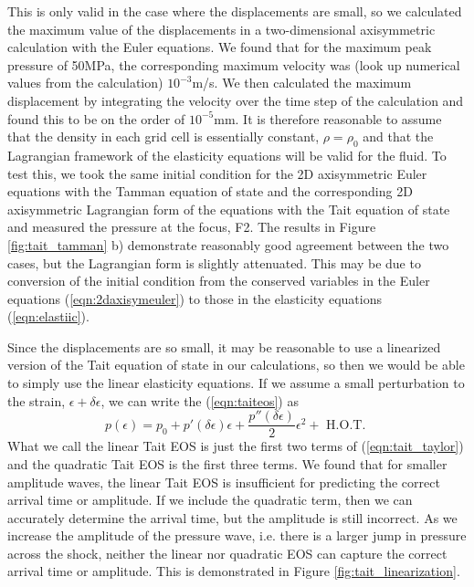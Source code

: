 \documentclass{article}
\begin{document}
This is only valid in the case where the displacements are small, so we calculated the maximum value of 
the displacements in a two-dimensional axisymmetric calculation with the Euler equations.  We found 
that for the maximum peak pressure of 50MPa, the corresponding maximum velocity was (look up 
numerical values from the calculation) $10^{-3}$m/s.  We then calculated the maximum displacement by 
integrating the velocity over the time step of the calculation and found this to be on the order of 
$10^{-5}$mm.  It is therefore reasonable to assume that the density in each grid cell is essentially 
constant, $\rho = \rho_0$ and that the Lagrangian framework of the elasticity equations will be valid for 
the fluid.  To test this, we took the same initial condition for the 2D axisymmetric Euler equations with the 
Tamman equation of state and the corresponding 2D axisymmetric Lagrangian form of the equations 
with the Tait equation of state and measured the pressure at the focus, F2.  The results in Figure 
\ref{fig:tait_tamman} b) demonstrate reasonably good agreement between the two cases, but the 
Lagrangian form is slightly attenuated.  This may be due to conversion of the initial condition from the 
conserved variables in the Euler equations (\ref{eqn:2daxisymeuler}) to those in the elasticity equations 
(\ref{eqn:elastiic}).

Since the displacements are so small, it may be reasonable to use a linearized version of the Tait 
equation of state in our calculations, so then we would be able to simply use the linear elasticity 
equations.  If we assume a small perturbation to the strain, $\epsilon + \delta \epsilon$, we can write the 
(\ref{eqn:taiteos}) as
\begin{equation}
	p(\epsilon) = p_0 + p'(\delta \epsilon) \epsilon + \frac{p''(\delta \epsilon)}{2} \epsilon^2 + 
\text{ H.O.T. }
	\label{eqn:tait_taylor}
\end{equation}
What we call the linear Tait EOS is just the first two terms of (\ref{eqn:tait_taylor}) and the quadratic Tait 
EOS is the first three terms.  We found that for smaller amplitude waves, the linear Tait EOS is insufficient 
for predicting the correct arrival time or amplitude.  If we include the quadratic term, then we can 
accurately determine the arrival time, but the amplitude is still incorrect.  As we increase the amplitude of 
the pressure wave, i.e. there is a larger jump in pressure across the shock, neither the linear nor 
quadratic EOS can capture the correct arrival time or amplitude.  This is demonstrated in Figure
\ref{fig:tait_linearization}.
\end{document}
